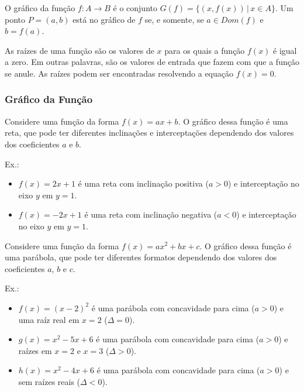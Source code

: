\documentclass[12pt]{article}
\begin{document}
O gráfico da função $f: A \rightarrow B$ é o conjunto $G(f) = \{(x, f(x)) \,|\, x \in A\}$.
Um ponto $P = (a, b)$ está no gráfico de $f$ se, e somente, se $a \in Dom(f)$ e $b = f(a)$.

As raízes de uma função são os valores de $x$ para os quais a função $f(x)$ é igual a zero. Em outras palavras, são os valores de entrada que fazem com que a função se anule. As raízes podem ser encontradas resolvendo a equação $f(x) = 0$.

\subsubsection{Gráfico da Função}
Considere uma função da forma $f(x)=ax+b$. O gráfico dessa função é uma reta, que pode ter diferentes inclinações e interceptações dependendo dos valores dos coeficientes $a$ e $b$.

Ex.:
    \begin{itemize}
        \item $f(x) = 2x + 1$ é uma reta com inclinação positiva ($a > 0$) e interceptação no eixo $y$ em $y = 1$.
        \item $f(x) = -2x + 1$ é uma reta com inclinação negativa ($a < 0$) e interceptação no eixo $y$ em $y = 1$.
    \end{itemize}

    \begin{center}
    \end{center}

\pagebreak
Considere uma função da forma $f(x)=ax^2+bx+c$. O gráfico dessa função é uma parábola, que pode ter diferentes formatos dependendo dos valores dos coeficientes $a$, $b$ e $c$.

Ex.:
    \begin{itemize}
        \item $f(x) = (x - 2)^2$ é uma parábola com concavidade para cima ($a > 0$) e uma raíz real em $x = 2$ ($\Delta = 0$).
        \item $g(x) = x^2 - 5x + 6$ é uma parábola com concavidade para cima ($a > 0$) e raízes em $x = 2$ e $x = 3$ ($\Delta > 0$).
        \item $h(x) = x^2 - 4x + 6$ é uma parábola com concavidade para cima ($a > 0$) e sem raízes reais ($\Delta < 0$).
    \end{itemize}
\end{document}
